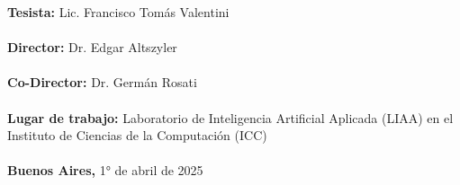 \begin{titlepage}
    \begin{minipage}[t]{0.9\textwidth}
        {\normalsize{\textbf{Tesista: }}{\normalsize{Lic. Francisco Tomás Valentini}}}\\ \\
        {\normalsize{\textbf{Director: }}{\normalsize{Dr. Edgar Altszyler}}}\\ \\
        {\normalsize{\textbf{Co-Director: }}{\normalsize{Dr. Germán Rosati}}}\\ \\
        {\normalsize{\textbf{Lugar de trabajo: }}{\normalsize{Laboratorio de Inteligencia Artificial Aplicada (LIAA) en el Instituto de Ciencias de la Computación (ICC)}}}\\ \\
        {\normalsize{\textbf{Buenos Aires, }}{\normalsize{1° de abril de 2025}}}
    \end{minipage}


\end{titlepage}
